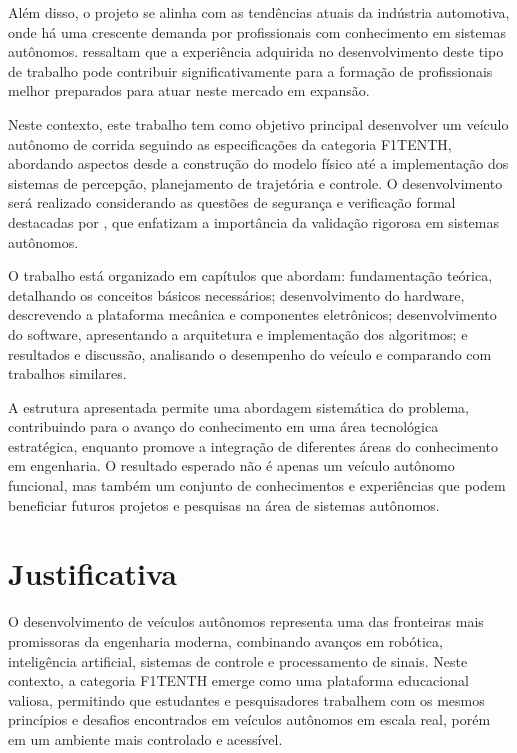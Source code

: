 Além disso, o projeto se alinha com as tendências atuais da indústria
automotiva, onde há uma crescente demanda por profissionais com conhecimento em
sistemas autônomos. \cite{Stachowicz2023FastRLAP} ressaltam que a experiência
adquirida no desenvolvimento deste tipo de trabalho pode contribuir
significativamente para a formação de profissionais melhor preparados para
atuar neste mercado em expansão.

Neste contexto, este trabalho tem como objetivo principal desenvolver um
veículo autônomo de corrida seguindo as especificações da categoria F1TENTH,
abordando aspectos desde a construção do modelo físico até a implementação dos
sistemas de percepção, planejamento de trajetória e controle. O desenvolvimento
será realizado considerando as questões de segurança e verificação formal
destacadas por \cite{Ivanov2020Verifying}, que enfatizam a importância da
validação rigorosa em sistemas autônomos.

O trabalho está organizado em capítulos que abordam: fundamentação teórica,
detalhando os conceitos básicos necessários; desenvolvimento do hardware,
descrevendo a plataforma mecânica e componentes eletrônicos; desenvolvimento do
software, apresentando a arquitetura e implementação dos algoritmos; e
resultados e discussão, analisando o desempenho do veículo e comparando com
trabalhos similares.

A estrutura apresentada permite uma abordagem sistemática do problema,
contribuindo para o avanço do conhecimento em uma área tecnológica estratégica,
enquanto promove a integração de diferentes áreas do conhecimento em
engenharia. O resultado esperado não é apenas um veículo autônomo funcional,
mas também um conjunto de conhecimentos e experiências que podem beneficiar
futuros projetos e pesquisas na área de sistemas autônomos.

\section*{Justificativa}\label{sec:Justificativa}

O desenvolvimento de veículos autônomos representa uma das fronteiras mais
promissoras da engenharia moderna, combinando avanços em robótica, inteligência
artificial, sistemas de controle e processamento de sinais. Neste contexto, a
categoria F1TENTH emerge como uma plataforma educacional valiosa, permitindo
que estudantes e pesquisadores trabalhem com os mesmos princípios e desafios
encontrados em veículos autônomos em escala real, porém em um ambiente mais
controlado e acessível.

